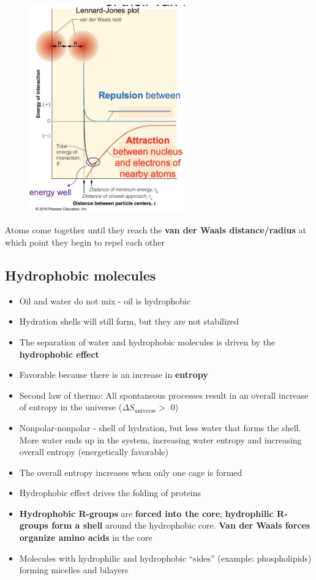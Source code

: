 \documentclass[letterpaper, 12pt]{article}
\begin{document}
\begin{figure}[H]
\centering
\includegraphics[width=0.6\textwidth]{lennardjones}
\end{figure}

Atoms come together until they reach the \textbf{van der Waals distance/radius} at which point they begin to repel each other

\subsection*{Hydrophobic molecules}

\begin{itemize}
\item Oil and water do not mix - oil is hydrophobic
\item Hydration shells will still form, but they are not stabilized
\item The separation of water and hydrophobic molecules is driven by the \textbf{hydrophobic effect}
\item Favorable because there is an increase in \textbf{entropy}
\item Second law of thermo: All spontaneous processes result in an overall increase of entropy in the universe ($\Delta S_\text{universe} >$ 0)
\item Nonpolar-nonpolar - shell of hydration, but less water that forms the shell. More water ends up in the system, increasing water entropy and increasing overall entropy (energetically favorable)
\item The overall entropy increases when only one cage is formed
\item Hydrophobic effect drives the folding of proteins
\item \textbf{Hydrophobic R-groups} are \textbf{forced into the core}; \textbf{hydrophilic R-groups form a shell} around the hydrophobic core. \textbf{Van der Waals forces organize amino acids} in the core
\item Molecules with hydrophilic and hydrophobic ``sides'' (example: phospholipids) forming micelles and bilayers
\end{itemize}
\end{document}
